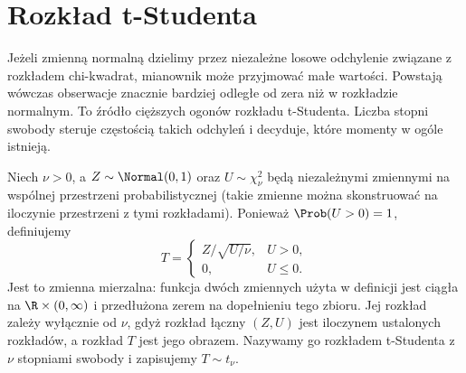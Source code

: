 \section{Rozkład t-Studenta}
Jeżeli zmienną normalną dzielimy przez niezależne losowe
odchylenie związane z rozkładem chi-kwadrat, mianownik może
przyjmować małe wartości. Powstają wówczas obserwacje znacznie
bardziej odległe od zera niż w rozkładzie normalnym. To źródło
cięższych ogonów rozkładu t-Studenta. Liczba stopni swobody
steruje częstością takich odchyleń i decyduje, które momenty
w ogóle istnieją.

\begin{definicja}
Niech $\nu>0$, a $Z\sim\Normal(0,1)$ oraz
$U\sim\chi^2_\nu$ będą niezależnymi zmiennymi na wspólnej
przestrzeni probabilistycznej (takie zmienne można
skonstruować na iloczynie przestrzeni z tymi rozkładami).
Ponieważ $\Prob(U>0)=1$, definiujemy
\[
T=\begin{cases}
Z/\sqrt{U/\nu},&U>0,\\
0,&U\leq0.
\end{cases}
\]
Jest to zmienna mierzalna: funkcja dwóch zmiennych
użyta w definicji jest ciągła na $\R\times(0,\infty)$
i przedłużona zerem na dopełnieniu tego zbioru.
Jej rozkład zależy wyłącznie od $\nu$, gdyż rozkład
łączny $(Z,U)$ jest iloczynem ustalonych rozkładów,
a rozkład $T$ jest jego obrazem.
Nazywamy go rozkładem t-Studenta z $\nu$ stopniami swobody
i zapisujemy $T\sim t_\nu$.
\end{definicja}

